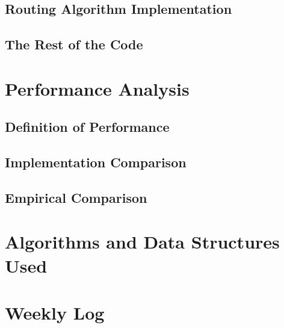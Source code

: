 \documentclass[letterpaper, 12pt]{article}
\begin{document}
\subsection{Routing Algorithm Implementation}
\subsection{The Rest of the Code}

\section{Performance Analysis}
\subsection{Definition of Performance}

\subsection{Implementation Comparison}

\subsection{Empirical Comparison}

\section{Algorithms and Data Structures Used}
\section{Weekly Log}

\clearpage
\nocite{*}
\printbibliography[
  heading=bibintoc,
  title={References}
]
\end{document}
